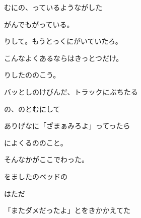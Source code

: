 \documentclass[a4paper,tate,twocolumn,12pt]{ltjtarticle}
\begin{document}
\begin{flushleft}
\begin{minipage}{\linewidth}
むにの、っているようながした
\end{minipage}

\vspace{2em}

\noindent\begin{minipage}{\linewidth}
がんでもがっている。

りして。もうとっくにがいていたろ。
\end{minipage}

\vspace{2em}

\noindent\begin{minipage}{\linewidth}
こんなよくあるならはきっとつだけ。

りしたののこう。
\end{minipage}

\vspace{2em}

\noindent\begin{minipage}{\linewidth}
バッとしのけびんだ、トラックにぶちたる

の、のとむにして

ありげなに「ざまぁみろよ」ってったら
\end{minipage}

\vspace{2em}

\noindent\begin{minipage}{\linewidth}
によくるののこと。

そんなかがここでわった。
\end{minipage}

\vspace{2em}

\noindent\begin{minipage}{\linewidth}
をましたのベッドの

はただ

「またダメだったよ」とをきかかえてた
\end{minipage}

\end{flushleft}
\end{document}
